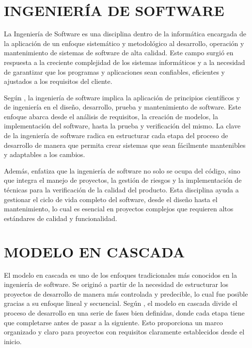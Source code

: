 	\section{INGENIERÍA DE SOFTWARE}
		La Ingeniería de Software es una disciplina dentro de la informática encargada de la aplicación de un enfoque sistemático y metodológico al desarrollo, operación y mantenimiento de sistemas de software de alta calidad. Este campo surgió en respuesta a la creciente complejidad de los sistemas informáticos y a la necesidad de garantizar que los programas y aplicaciones sean confiables, eficientes y ajustados a los requisitos del cliente.
		
		Según \textcite{sommerville2011introduccion}, la ingeniería de software implica la aplicación de principios científicos y de ingeniería en el diseño, desarrollo, prueba y mantenimiento de software. Este enfoque abarca desde el análisis de requisitos, la creación de modelos, la implementación del software, hasta la prueba y verificación del mismo. La clave de la ingeniería de software radica en estructurar cada etapa del proceso de desarrollo de manera que permita crear sistemas que sean fácilmente mantenibles y adaptables a los cambios.
		
		Además, \textcite{pressman2010ingenieria} enfatiza que la ingeniería de software no solo se ocupa del código, sino que integra el manejo de proyectos, la gestión de riesgos y la implementación de técnicas para la verificación de la calidad del producto. Esta disciplina ayuda a gestionar el ciclo de vida completo del software, desde el diseño hasta el mantenimiento, lo cual es esencial en proyectos complejos que requieren altos estándares de calidad y funcionalidad.
		
	\section{MODELO EN CASCADA}
		El modelo en cascada es uno de los enfoques tradicionales más conocidos en la ingeniería de software. Se originó a partir de la necesidad de estructurar los proyectos de desarrollo de manera más controlada y predecible, lo cual fue posible gracias a su enfoque lineal y secuencial. Según \textcite{sommerville2011introduccion}, el modelo en cascada divide el proceso de desarrollo en una serie de fases bien definidas, donde cada etapa tiene que completarse antes de pasar a la siguiente. Esto proporciona un marco organizado y claro para proyectos con requisitos claramente establecidos desde el inicio.
		
